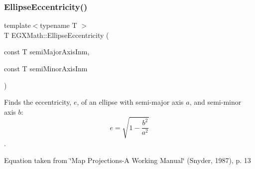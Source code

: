 \subsubsection{\texorpdfstring{Ellipse\+Eccentricity()}{EllipseEccentricity()}\hspace{0.1cm}{\footnotesize\ttfamily [2/2]}}
{\footnotesize\ttfamily template$<$typename T $>$ \\
T E\+G\+X\+Math\+::\+Ellipse\+Eccentricity (\begin{DoxyParamCaption}\item[{const T}]{semi\+Major\+Axis\+Inm,  }\item[{const T}]{semi\+Minor\+Axis\+Inm }\end{DoxyParamCaption})}



Finds the eccentricity, $e$, of an ellipse with semi-\/major axis $a$, and semi-\/minor axis $b$\+: \[ e = \sqrt{1-\frac{b^2}{a^2}}\]. 

Equation taken from \char`\"{}\+Map Projections-\/\+A Working Manual\char`\"{} (Snyder, 1987), p. 13

